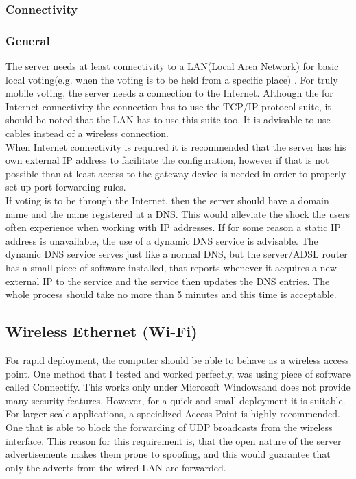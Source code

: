 \documentclass[11pt,twoside,a4paper]{book}
\begin{document}
\subsubsection{Connectivity}
\subsubsection{General}
The server needs at least connectivity to a LAN(Local Area Network) for basic local voting(e.g. when the voting is to be held from a specific place) . For truly mobile voting, the server needs a connection to the Internet. Although the for Internet connectivity the connection has to use the TCP/IP protocol  suite, it should be noted that the LAN has to use this suite too. It is advisable to use cables instead of a wireless connection. \\
When Internet connectivity is required it is recommended that the server has his own external IP address to facilitate the configuration, however if that is not possible than at least access to the gateway device is needed in order to properly set-up port forwarding rules.
\\
If voting is to be through the Internet, then the server should have a domain name and the name registered at a DNS. This would alleviate the shock the users often experience when working with IP addresses. If for some reason a static IP address is unavailable, the use of a dynamic DNS service is advisable. The dynamic DNS service serves just like a normal DNS, but the server/ADSL router has a small piece of software installed, that reports whenever it acquires a new external IP to the service and the service then updates the DNS entries. The whole process should take no more than 5 minutes and this time is acceptable.
\\
\subsection{Wireless Ethernet (Wi-Fi)}
For rapid deployment, the computer should be able to behave as a wireless access point. One method that I tested and worked perfectly, was using piece of software called Connectify\cite{connectify}. This works only under Microsoft \textregistered Windows\textregistered and does not provide many security features. However, for a quick and small deployment it is suitable. \\
For larger scale applications, a specialized Access Point is highly recommended. One that is able to block  the forwarding of UDP broadcasts from the wireless interface. This reason for this requirement is, that the open nature of the server advertisements makes them prone to spoofing, and this would guarantee that only the adverts from the wired LAN are forwarded.  
\end{document}
